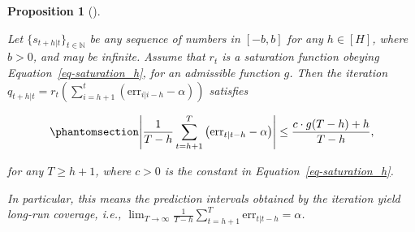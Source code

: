 \documentclass[
  11pt,
  a4paper,
]{article}
\theoremstyle{plain}
\newtheorem{proposition}{Proposition}[section]
\theoremstyle{plain}
\theoremstyle{remark}
\begin{document}
\begin{proposition}[]\protect\hypertarget{prp-cov_acmcp}{}\label{prp-cov_acmcp}

Let \(\{s_{t+h|t}\}_{t\in\mathbb{N}}\) be any sequence of numbers in
\([-b, b]\) for any \(h\in[H]\), where \(b>0\), and may be infinite.
Assume that \(r_t\) is a saturation function obeying
Equation~\ref{eq-saturation_h}, for an admissible function \(g\). Then
the iteration
\(q_{t+h|t}=r_t\left(\sum_{i=h+1}^t\left(\mathrm{err}_{i|i-h}-\alpha\right)\right)\)
satisfies

\begin{equation}\phantomsection\label{eq-cov_acmcp}{
\left|\frac{1}{T-h}\sum_{t=h+1}^{T}\left(\mathrm{err}_{t|t-h}-\alpha\right)\right| \leq \frac{c \cdot g(T-h) + h}{T-h},
}\end{equation}

for any \(T \geq h+1\), where \(c>0\) is the constant in
Equation~\ref{eq-saturation_h}.

In particular, this means the prediction intervals obtained by the
iteration yield long-run coverage, i.e.,
\(\lim _{T \rightarrow \infty} \frac{1}{T-h} \sum_{t=h+1}^T \mathrm{err}_{t|t-h} = \alpha\).

\end{proposition}
\end{document}

